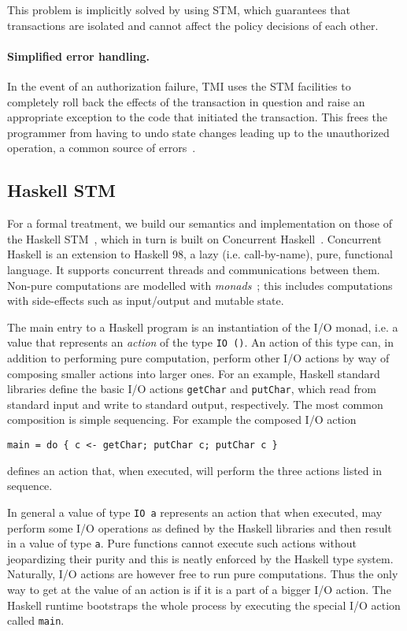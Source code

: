 This problem is implicitly solved by using STM, which guarantees that transactions are 
isolated and cannot affect the policy decisions of each other.

\paragraph{Simplified error handling.} In the event of an authorization failure, TMI uses the STM
facilities to completely roll back the effects of the transaction in question and raise an appropriate
exception to the code that initiated the transaction. This frees the programmer from having to
undo state changes leading up to the unauthorized operation, a common source of 
errors~\cite{errorHandlingMistakes}.


\subsection{Haskell STM} %
\label{sub:haskell_stm}

For a formal treatment, we build our semantics and implementation on those of the Haskell STM~\cite{haskellstm},
which in turn is built on Concurrent Haskell~\cite{concurrenthaskell}. Concurrent Haskell is an extension to Haskell 98,
a lazy (i.e. call-by-name), pure, functional language. It supports concurrent threads and communications
between them. Non-pure computations are modelled with {\em monads}~\cite{monads}; this includes computations
with side-effects such as input/output and mutable state.

The main entry to a Haskell program is an instantiation of the I/O monad, i.e. a value that represents an
{\em action} of the type \lstinline+IO ()+. An action of this type can, in addition to performing pure
computation, perform other I/O actions by way of composing smaller actions into larger ones. For an example,
Haskell standard libraries define the basic I/O actions \lstinline+getChar+ and \lstinline+putChar+, which
read from standard input and write to standard output, respectively. The most common composition is simple
sequencing. For example the composed I/O action
\begin{lstlisting}[style=small]
main = do { c <- getChar; putChar c; putChar c }
\end{lstlisting}
defines an action that, when executed, will perform the three actions listed in sequence.

In general a value of type \lstinline+IO a+ represents an action that when executed, may perform some
I/O operations as defined by the Haskell libraries and then result in a value of type \lstinline+a+.
Pure functions cannot execute such actions without jeopardizing their purity and this is neatly enforced
by the Haskell type system. Naturally, I/O actions are however free to run pure computations. Thus
the only way to get at the value of an action is if it is a part of a bigger I/O action. The Haskell
runtime bootstraps the whole process by executing the special I/O action called \lstinline+main+.

